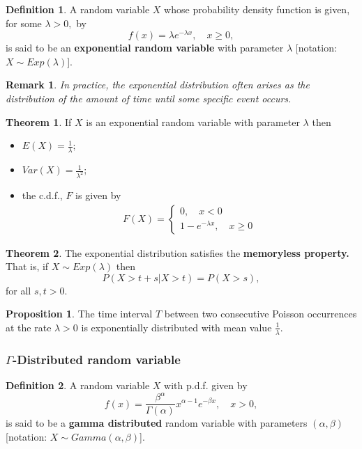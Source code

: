 \documentclass[12pt, a4paper]{article}
\newtheorem*{remark}{Remark}
\theoremstyle{definition}
\newtheorem{definition}{Definition}[section]
\newtheorem{theorem}{Theorem}[section]
\newtheorem{proposition}{Proposition}
\theoremstyle{plain}
\begin{document}
\begin{definition}
A random variable $X$ whose probability density function is given, for some $\lambda > 0,$ by $$f(x)=\lambda e^{-\lambda x}, \quad x\geq0,$$ is said to be an \textbf{exponential random variable} with parameter $\lambda$
[notation: $X \sim Exp(\lambda)$].
\end{definition}

\begin{remark}
In practice, the exponential distribution often arises as the distribution of the amount of time until some specific event occurs.
\end{remark}

\begin{theorem}
If $X$ is an exponential random variable with parameter $\lambda$ then \begin{itemize}
	
	\item $E(X)=\frac{1}{\lambda};$
	\item $Var(X)=\frac{1}{\lambda^2};$
	\item the c.d.f., $F$ is given by $$\begin{aligned}
	F(X)=\begin{cases}0, \quad x<0 \\ 1-e^{-\lambda x}, \quad x\geq 0\end{cases}
	\end{aligned}$$

\end{itemize}
\end{theorem}

\begin{theorem}
The exponential distribution satisfies the \textbf{memoryless property.} That is, if $X \sim Exp(\lambda)$ then $$P(X>t+s|X>t)=P(X>s),$$ for all $s,t>0.$
\end{theorem}

\begin{proposition}
The time interval $T$ between two consecutive Poisson occurrences at the rate $\lambda > 0$ is exponentially distributed with mean value $\frac{1}{\lambda}.$
\end{proposition}

\subsubsection{\texorpdfstring{$\Gamma$}{TEXT}-Distributed random variable}

\begin{definition}
A random variable $X$ with p.d.f. given by $$f(x) = \frac{\beta^\alpha}{\Gamma(\alpha)}x^{\alpha-1}e^{-\beta x}, \quad x>0,$$ is said to be a \textbf{gamma distributed} random variable with parameters $(\alpha, \beta)$ [notation: $X \sim Gamma(\alpha, \beta)$].
\end{definition}
\end{document}
